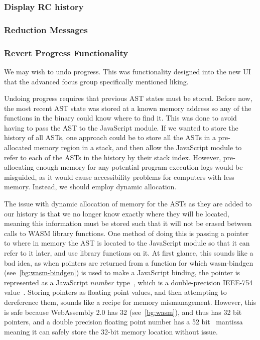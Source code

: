 \subsubsection{Display RC history}

\subsubsection{Reduction Messages}

\subsubsection{Revert Progress Functionality}
We may wish to undo progress. This was functionality designed into the new UI that the advanced focus group specifically mentioned liking. 

Undoing progress requires that previous \ac{AST} states must be stored. Before now, the most recent \ac{AST} state was stored at a known memory address so any of the functions in the binary could know where to find it. This was done to avoid having to pass the AST to the JavaScript module. If we wanted to store the history of all \ac{AST}s, one approach could be to store all the \ac{AST}s in a pre-allocated memory region in a stack, and then allow the JavaScript module to refer to each of the \ac{AST}s in the history by their stack index. However, pre-allocating enough memory for any potential program execution logs would be misguided, as it would cause accessibility problems for computers with less memory. Instead, we should employ dynamic allocation. 

The issue with dynamic allocation of memory for the \ac{AST}s as they are added to our history is that we no longer know exactly where they will be located, meaning this information must be stored such that it will not be erased between calls to \ac{WASM} library functions. One method of doing this is passing a pointer to where in memory the AST is located to the JavaScript module so that it can refer to it later, and use library functions on it. At first glance, this sounds like a bad idea, as when pointers are returned from a function for which wasm-bindgen (see~\ref{bg:wasm-bindgen}) is used to make a JavaScript binding, the pointer is represented as a JavaScript $number$ type~\cite{wasm_bindgen_guide}, which is a double-precision IEEE-754 value~\cite{ecma262number}. Storing pointers as floating point values, and then attempting to dereference them, sounds like a recipe for memory mismanagement. However, this is safe because WebAssembly 2.0 has 32 (see~\ref{bg:wasm}), and thus has 32 bit pointers, and a double precision floating point number has a 52 bit~\cite{ieee754} mantissa meaning it can safely store the 32-bit memory location without issue. 

